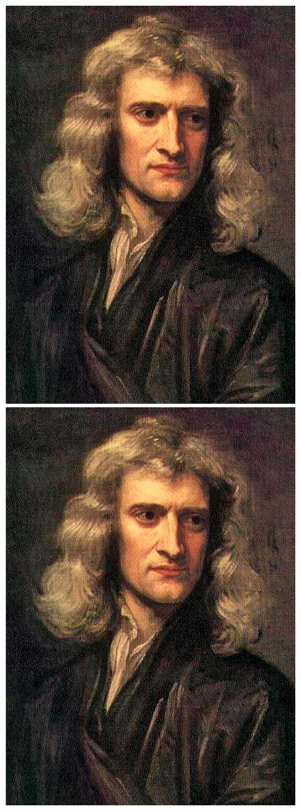 \documentclass[12pt, letter]{exam}
\begin{document}
\begin{questions}
\begin{mdframed}[style=mystyle]
\begin{figure}[H]
\centering
\includegraphics[scale=0.3]{isaac}
\includegraphics[scale=0.2]{isaac}

\end{figure}
\end{mdframed}
\end{questions}
\end{document}
